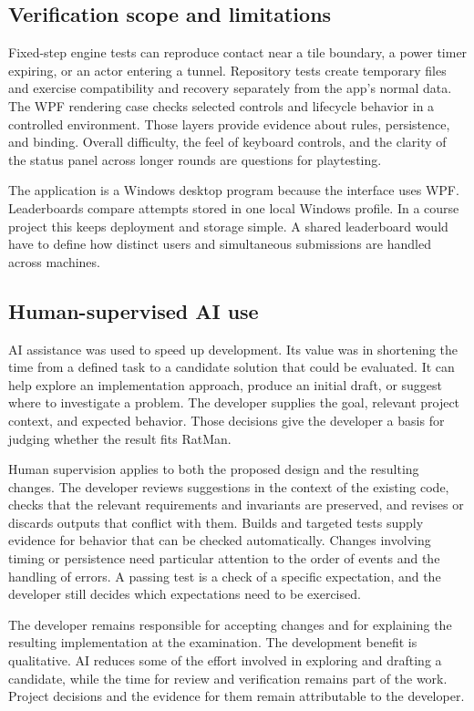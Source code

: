 \clearpage
\subsection{Verification scope and limitations}

Fixed-step engine tests can reproduce contact near a tile boundary, a power timer expiring, or an actor entering a tunnel. Repository tests create temporary files and exercise compatibility and recovery separately from the app's normal data. The WPF rendering case checks selected controls and lifecycle behavior in a controlled environment. Those layers provide evidence about rules, persistence, and binding. Overall difficulty, the feel of keyboard controls, and the clarity of the status panel across longer rounds are questions for playtesting.

The application is a Windows desktop program because the interface uses WPF. Leaderboards compare attempts stored in one local Windows profile. In a course project this keeps deployment and storage simple. A shared leaderboard would have to define how distinct users and simultaneous submissions are handled across machines.

\subsection{Human-supervised AI use}

AI assistance was used to speed up development. Its value was in shortening the time from a defined task to a candidate solution that could be evaluated. It can help explore an implementation approach, produce an initial draft, or suggest where to investigate a problem. The developer supplies the goal, relevant project context, and expected behavior. Those decisions give the developer a basis for judging whether the result fits RatMan.

Human supervision applies to both the proposed design and the resulting changes. The developer reviews suggestions in the context of the existing code, checks that the relevant requirements and invariants are preserved, and revises or discards outputs that conflict with them. Builds and targeted tests supply evidence for behavior that can be checked automatically. Changes involving timing or persistence need particular attention to the order of events and the handling of errors. A passing test is a check of a specific expectation, and the developer still decides which expectations need to be exercised.

The developer remains responsible for accepting changes and for explaining the resulting implementation at the examination. The development benefit is qualitative. AI reduces some of the effort involved in exploring and drafting a candidate, while the time for review and verification remains part of the work. Project decisions and the evidence for them remain attributable to the developer.

